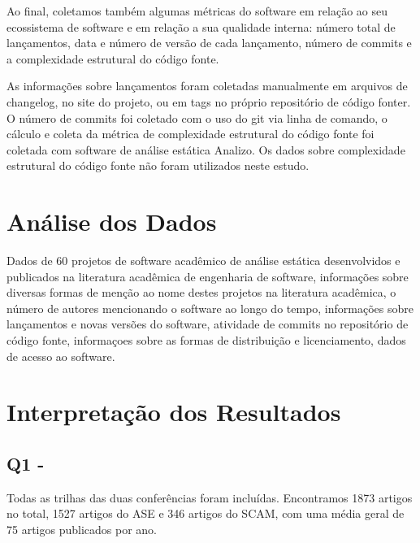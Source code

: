 Ao final, coletamos também algumas métricas do software em relação ao seu
ecossistema de software e em relação a sua qualidade interna: número
total de lançamentos, data e número de versão de cada lançamento, número de
commits e a complexidade estrutural do código fonte.

As informações sobre lançamentos foram coletadas manualmente em arquivos de
changelog, no site do projeto, ou em tags no próprio repositório de código
fonter. O número de commits foi coletado com o uso do git via linha de comando,
o cálculo e coleta da métrica de complexidade estrutural do código fonte foi
coletada com software de análise estática Analizo.
Os dados sobre complexidade estrutural do código fonte não foram utilizados
neste estudo.

\section{Análise dos Dados} %
\label{sec:study1:analysis}

Dados de 60 projetos de software acadêmico de análise estática desenvolvidos e
publicados na literatura acadêmica de engenharia de software, informações sobre
diversas formas de menção ao nome destes projetos na literatura acadêmica,
o número de autores mencionando o software ao longo do tempo, informações sobre
lançamentos e novas versões do software, atividade de commits no repositório
de código fonte, informaçoes sobre as formas de distribuição e licenciamento,
dados de acesso ao software.



\section{Interpretação dos Resultados} %
\label{sec:study1:interpretation}


\subsection{Q1 - \EstudoDoisQuestaoUm}

Todas as trilhas das duas conferências foram incluídas. 
Encontramos 1873 artigos no total, 1527 artigos do ASE e 346
artigos do SCAM, 
com uma média geral de 75 artigos publicados por ano. 

